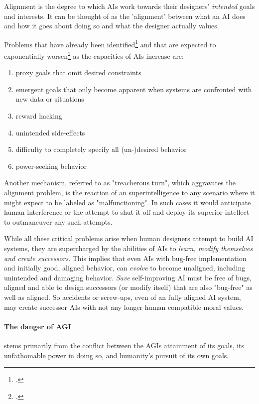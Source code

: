 \documentclass[12pt, a4paper]{article}
\begin{document}
				
				Alignment is the degree to which AIs work towards their designers' \textit{intended} goals and interests.
				It can be thought of as the 'alignment' between what an AI does and how it goes about doing so and what the designer actually values.
				
				Problems that have already been identified\footcite{russell2009ethics} and that are expected to exponentially worsen\footcite{carlsmith22} as the capacities of AIs increase are:
				\begin{enumerate}
					\item proxy goals that omit desired constraints
					\item emergent goals that only become apparent when systems are confronted with new data or situations
					\item reward hacking
					\item unintended side-effects
					\item difficulty to completely specify all (un-)desired behavior
					\item power-seeking behavior
				\end{enumerate}
				Another mechanism, referred to as "treacherous turn", which aggravates the alignment problem, is the reaction of an superintelligence to any scenario where it might expect to be labeled as "malfunctioning".
				In such cases it would anticipate human interference or the attempt to shut it off and deploy its superior intellect to outmaneuver any such attempts.
				
				While all these critical problems arise when human designers attempt to build AI systems, they are supercharged by the abilities of AIs to \textit{learn, modify themselves and create successors}.
				This implies that even AIs with bug-free implementation and initially good, aligned behavior, can \textit{evolve} to become unaligned, including unintended and damaging behavior.
				\textit{Save} self-improving AI must be free of bugs, aligned and able to design successors (or modify itself) that are also "bug-free" as well as aligned.
				So accidents or screw-ups, even of an fully aligned AI system, may create successor AIs with not any longer human compatible moral values.
				
		\paragraph[Danger of AGI]{The danger of AGI}
			stems primarily from the conflict between the AGIs attainment of its goals, its unfathomable power in doing so, and humanity's pursuit of its own goals.
			
\end{document}
